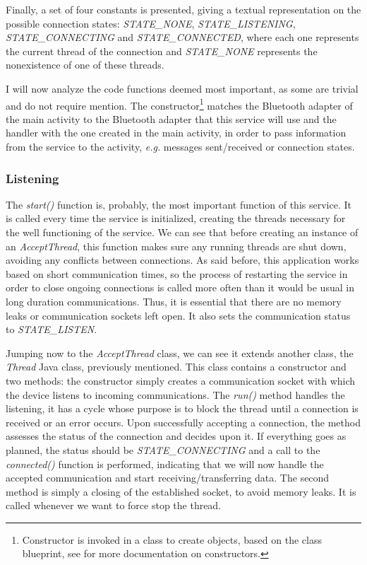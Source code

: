 Finally, a set of four constants is presented, giving a textual representation on the possible connection states: \textit{STATE\_NONE}, \textit{STATE\_LISTENING}, \textit{STATE\_CONNECTING} and \textit{STATE\_CONNECTED}, where each one represents the current thread of the connection and \textit{STATE\_NONE} represents the nonexistence of one of these threads.

I will now analyze the code functions deemed most important, as some are trivial and do not require mention. The constructor\footnote{Constructor is invoked in a class to create objects, based on the class blueprint, see \cite{constructors} for more documentation on constructors.} matches the Bluetooth adapter of the main activity to the Bluetooth adapter that this service will use and the handler with the one created in the main activity, in order to pass information from the service to the activity, \textit{e.g.} messages sent/received or connection states.

\subsubsection{Listening}
\label{subsubsec:listening}

The \textit{start()} function is, probably, the most important function of this service. It is called every time the service is initialized, creating the threads necessary for the well functioning of the service. We can see that before creating an instance of an \textit{AcceptThread}, this function makes sure any running threads are shut down, avoiding any conflicts between connections. As said before, this application works based on short communication times, so the process of restarting the service in order to close ongoing connections is called more often than it would be usual in long duration communications. Thus, it is essential that there are no memory leaks or communication sockets left open. It also sets the communication status to \textit{STATE\_LISTEN}.

Jumping now to the \textit{AcceptThread} class, we can see it extends another class, the \textit{Thread} Java class, previously mentioned. This class contains a constructor and two methods: the constructor simply creates a communication socket with which the device listens to incoming communications. The \textit{run()} method handles the listening, it has a cycle whose purpose is to block the thread until a connection is received or an error occurs. Upon successfully accepting a connection, the method assesses the status of the connection and decides upon it. If everything goes as planned, the status should be \textit{STATE\_CONNECTING} and a call to the \textit{connected()} function is performed, indicating that we will now handle the accepted communication and start receiving/transferring data. The second method is simply a closing of the established socket, to avoid memory leaks. It is called whenever we want to force stop the thread.


